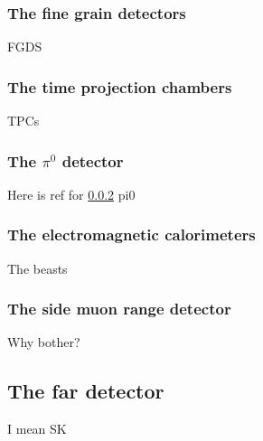 \subsubsection{The fine grain detectors}
\label{subsubsec:FGD}
FGDS

\subsubsection{The time projection chambers}
\label{subsubsec:TPC}
TPCs

\subsubsection{The $\pi^0$ detector}
\label{subsubsec:pi0detector}
Here is ref for \ref{subsubsec:TPC}
pi0

\subsubsection{The electromagnetic calorimeters}
\label{subsubsec:ecal}
The beasts

\subsubsection{The side muon range detector}
\label{subsubsec:smrd}
Why bother?

\subsection{The far detector}
I mean SK


